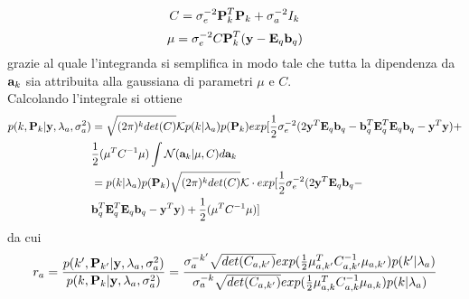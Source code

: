 \begin{equation}
C=\sigma_e^{-2}\textbf{P}_k^T\textbf{P}_k+\sigma_a^{-2} I_k
\end{equation}
\begin{equation}
\mu=\sigma_e^{-2} C\textbf{P}_k^T(\textbf{y}-\textbf{E}_q\textbf{b}_q)
\end{equation}
grazie al quale l’integranda si semplifica in modo tale che tutta la dipendenza da $\textbf{a}_k$ sia attribuita alla gaussiana di parametri $\mu$ e $C$.\\
Calcolando l’integrale si ottiene
\begin{align*}
p(k,\textbf{P}_k | \textbf{y},\lambda_a,\sigma_a^2)&=\sqrt{(2\pi)^k det(C)}\mathcal{K}p(k |\lambda_a)p(\textbf{P}_k) exp[\frac{1}{2}\sigma_e^{-2}(2\textbf{y}^T\textbf{E}_q\textbf{b}_q-\textbf{b}_q^T\textbf{E}_q^T\textbf{E}_q\textbf{b}_q-\textbf{y}^T\textbf{y})+\\&\frac{1}{2}(\mu^T C^{-1}\mu)\int \mathcal{N}(\textbf{a}_k|\mu,C)d\textbf{a}_k\\
&=p(k|\lambda_a)p(\textbf{P}_k)\sqrt{(2\pi)^k det(C)}\mathcal{K}\cdot exp[\frac{1}{2} \sigma_e^{-2}(2\textbf{y}^T\textbf{E}_q\textbf{b}_q-\\ &\textbf{b}_q^T\textbf{E}_q^T\textbf{E}_q\textbf{b}_q-\textbf{y}^T\textbf{y})+\frac{1}{2}(\mu^T C^{-1}\mu)]
\end{align*}
da cui
\begin{equation}
r_a=\frac{p(k',\textbf{P}_{k'}|\textbf{y},\lambda_a,\sigma_a^2)}{p(k,\textbf{P}_k|\textbf{y},\lambda_a,\sigma_a^2)}=\frac{\sigma_a^{-k'}\sqrt{det(C_{a,k'})}
exp(\frac{1}{2}\mu_{a,k'}^TC_{a,k'}^{-1}\mu_{a,k'})p(k'|\lambda_a)}{\sigma_a^{-k}\sqrt{det(C_{a,k'})}
exp(\frac{1}{2}\mu_{a,k}^TC_{a,k}^{-1}\mu_{a,k})p(k|\lambda_a)}
\end{equation}
